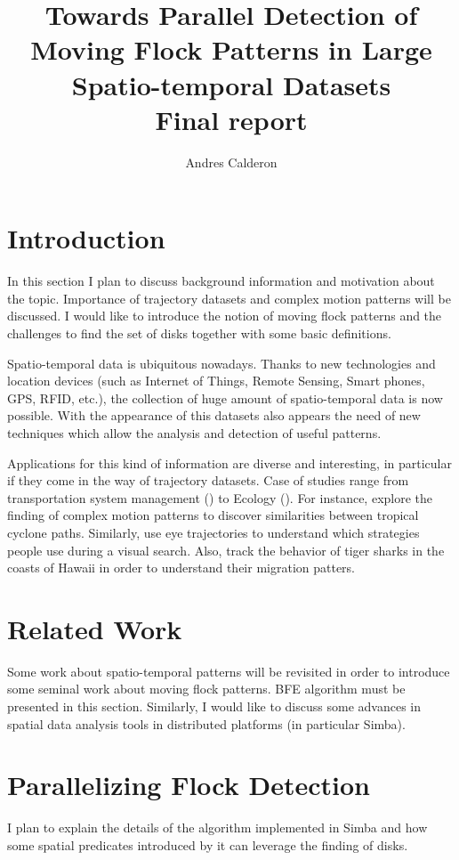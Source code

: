 \documentclass[12pt]{scrartcl}
\title{Towards Parallel Detection of Moving Flock Patterns in Large Spatio-temporal Datasets\\ \normalsize{Final report}}
\author{Andres Calderon}
\begin{document}
\maketitle
 
\section{Introduction}
In this section I plan to discuss background information and motivation about the topic.  Importance of trajectory datasets and complex motion patterns will be discussed.  I would like to introduce the notion of moving flock patterns and the challenges to find the set of disks together with some basic definitions.

Spatio-temporal data is ubiquitous nowadays. Thanks to new technologies and location devices (such as Internet of Things, Remote Sensing, Smart phones, GPS, RFID, etc.), the collection of huge amount of spatio-temporal data is now possible. With the appearance of this datasets also appears the need of new techniques which allow the analysis and detection of useful patterns.  

Applications for this kind of information are diverse and interesting, in particular if they come in the way of trajectory datasets. Case of studies range from transportation system management (\cite{di_lorenzo_allaboard:_2016,johansson_efficiency_2015}) to Ecology (\cite{johnston_abundance_2015, la_sorte_convergence_2016}).  For instance, \cite{turdukulov_visual_2014} explore the finding of complex motion patterns to discover similarities between tropical cyclone paths.  Similarly, \cite{amor_persistence_2016} use eye trajectories to understand which strategies people use during a visual search. Also, \cite{holland_movements_1999} track the behavior of tiger sharks in the coasts of Hawaii in order to understand their migration patters.

\section{Related Work}
Some work about spatio-temporal patterns will be revisited in order to introduce some seminal work about moving flock patterns.  BFE algorithm must be presented in this section.  Similarly, I would like to discuss some advances in spatial data analysis tools in distributed platforms (in particular Simba).

\section{Parallelizing Flock Detection}
I plan to explain the details of the algorithm implemented in Simba and how some spatial predicates introduced by it can leverage the finding of disks.
\end{document}
